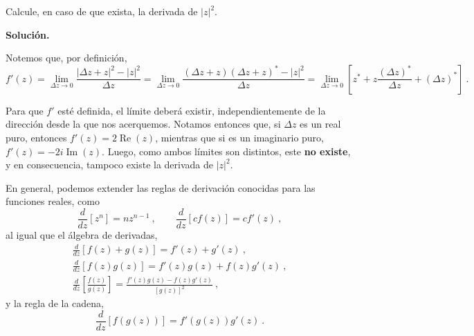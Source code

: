 \begin{ejemplo}
    Calcule, en caso de que exista, la derivada de $|z|^2$.

    \noindent \textbf{Solución.}

    \noindent Notemos que, por definición,
    \begin{equation*}
        f'(z) = \lim_{\Delta z \to 0} \frac{|\Delta z + z|^2 - |z|^2}{\Delta z} = \lim_{\Delta z \to 0} \frac{(\Delta z + z)(\Delta z + z)^\ast - |z|^2}{\Delta z} = \lim_{\Delta z \to 0} \left[ z^\ast + z \frac{(\Delta z)^\ast}{\Delta z} + (\Delta z)^\ast \right] \ .
    \end{equation*}

    Para que $f'$ esté definida, el límite deberá existir, independientemente de la dirección desde la que nos acerquemos. Notamos entonces que, si $\Delta z$ es un real puro, entonces $f'(z) = 2 \operatorname{Re}(z)$, mientras que si es un imaginario puro, $f'(z) = -2i \operatorname{Im}(z)$. Luego, como ambos límites son distintos, este \textbf{no existe}, y en consecuencia, tampoco existe la derivada de $|z|^2$.
\end{ejemplo}

En general, podemos extender las reglas de derivación conocidas para las funciones reales, como 
\begin{equation*}
    \frac{d}{dz}[z^n] = n z^{n-1} \ , \quad\quad  \frac{d}{dz}[c f(z)] = c f'(z) \ ,
\end{equation*}
al igual que el álgebra de derivadas,
\begin{gather*}
    \frac{d}{dz}[f(z) + g(z)] = f'(z) + g'(z) \ , \\
    \frac{d}{dz}[f(z) g(z)] = f'(z) g(z) + f(z) g'(z) \ , \\
    \frac{d}{dz} \left[ \frac{f(z)}{g(z)} \right] = \frac{f'(z)g(z) - f(z)g'(z)}{[g(z)]^2} \ ,
\end{gather*}
y la regla de la cadena,
\begin{equation*}
    \frac{d}{dz}[f(g(z))] = f'(g(z)) g'(z) \ .
\end{equation*}

